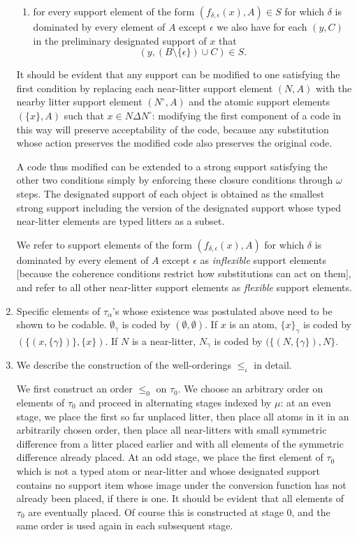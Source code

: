 \documentclass[12pt]{article}
\begin{document}
\begin{enumerate}
\begin{enumerate}
\item for every support element of the form $(f_{\delta,\epsilon}(x),A) \in S$ for which $\delta$ is dominated by every element of $A$ except $\epsilon$ we also have for each $(y,C)$ in the preliminary designated support
of $x$ that $$(y,(B \setminus \{\epsilon\})\cup C)\in S.$$

\end{enumerate}  It should be evident that any support can be modified to one satisfying the first condition by replacing each near-litter support element
$(N,A)$ with the nearby litter support element $(N^\circ,A)$ and the atomic support elements  $(\{x\},A)$ such that $x \in N \Delta N^\circ$:  modifying the first component of a code
in this way will preserve acceptability of the code, because any substitution whose action preserves the modified code also preserves the original code.

A code thus modified can be extended to a strong support satisfying the other two conditions simply by enforcing these closure conditions through $\omega$ steps.  The designated support  of each object is obtained as the  smallest strong support including the version of the designated support whose typed near-litter elements are typed litters  as a subset.

We refer to support elements of the form $(f_{\delta,\epsilon}(x),A)$ for which $\delta$ is dominated by every element of $A$ except $\epsilon$ as {\em inflexible\/} support elements [because the coherence conditions restrict how substitutions can act on them], and refer to all other near-litter support elements as {\em flexible\/} support elements.

\item Specific elements of $\tau_\alpha$'s whose existence was postulated above need to be shown to be codable.  $\emptyset_\gamma$ is coded by $(\emptyset,\emptyset)$.  If $x$ is an atom, $\{x\}_\gamma$ is coded by $(\{(x,\{\gamma\})\},\{x\})$.  If $N$ is a near-litter,
$N_\gamma$ is coded by $(\{(N,\{\gamma\}),N\}$.

\item  We describe the construction of the well-orderings $\leq_\iota$ in detail.

We first construct an order $\leq_0$  on $\tau_0$.  We choose an arbitrary order on elements of $\tau_0$ and proceed in alternating stages indexed by $\mu$:  at an even stage, we place the first so far unplaced litter, then place all atoms in it in an arbitrarily chosen order, then place all near-litters with small symmetric difference from a litter placed earlier and with all elements of the symmetric difference already placed.  At an odd stage, we place the first element of $\tau_0$ which is not a typed atom or near-litter and whose designated support contains no support item whose image under the conversion function has not already been placed, if there is one.  It should be evident that all elements of $\tau_0$ are eventually placed.  Of course this is constructed
at stage 0, and the same order is used again in each subsequent stage.


\end{enumerate}
\end{document}
